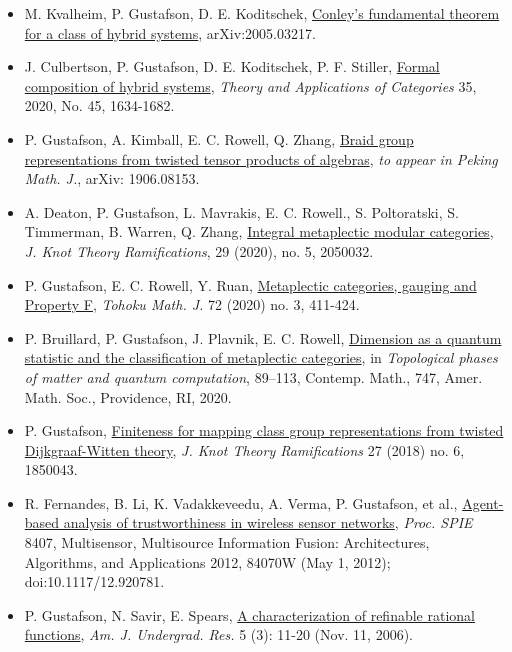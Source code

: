   \begin{itemize}

\item[] M. Kvalheim, P. Gustafson, D. E. Koditschek, \href{https://arxiv.org/abs/2005.03217}{Conley's fundamental theorem for a class of hybrid systems}, arXiv:2005.03217.

\item[] J. Culbertson, P. Gustafson, D. E. Koditschek, P. F. Stiller, \href{http://www.tac.mta.ca/tac/volumes/35/45/35-45abs.html}{Formal composition of hybrid systems}, \emph{Theory and Applications of Categories} {35}, 2020, No. 45, 1634-1682.

  \item[] P. Gustafson, A. Kimball, E. C. Rowell, Q. Zhang, \href{https://arxiv.org/abs/1906.08153}{Braid group representations from twisted tensor products of algebras}, \emph{to appear in Peking Math. J.}, arXiv: 1906.08153.

  \item[]  A. Deaton, P. Gustafson, L. Mavrakis, E. C. Rowell., S. Poltoratski, S. Timmerman, B. Warren, Q. Zhang, \href{https://arxiv.org/abs/1901.04462}{Integral metaplectic modular categories}, \emph{J. Knot Theory Ramifications}, 29 (2020), no. 5, 2050032.
  
  \item[] P. Gustafson, E. C. Rowell, Y. Ruan, \href{https://arxiv.org/abs/1808.00698}{Metaplectic categories, gauging and Property F}, \emph{Tohoku Math. J.} {72} (2020) no. 3, 411-424.

  \item[] P. Bruillard, P. Gustafson, J. Plavnik, E. C. Rowell, \href{https://arxiv.org/abs/1710.10284}{Dimension as a quantum statistic and the classification of metaplectic categories}, in \emph{Topological phases of matter and quantum computation}, 89–113, Contemp. Math., 747, Amer. Math. Soc., Providence, RI, 2020.
    
  \item[] P. Gustafson, \href{https://arxiv.org/abs/1610.06069}{Finiteness for mapping class group representations from twisted Dijkgraaf-Witten theory}, \emph{J. Knot Theory Ramifications} 27 (2018) no. 6, 1850043.

  \item[] R. Fernandes, B. Li, K. Vadakkeveedu, A. Verma, P. Gustafson, et al., \href{http://proceedings.spiedigitallibrary.org/proceeding.aspx?articleid=1354959}{Agent-based analysis of trustworthiness in wireless sensor networks}, \emph{Proc. SPIE} {8407}, Multisensor, Multisource Information Fusion: Architectures, Algorithms, and Applications 2012, 84070W (May 1, 2012); doi:10.1117/12.920781. 

 \item[] P. Gustafson, N. Savir, E. Spears, \href{http://www.uni.edu/ajur/v5n3/Gufstafson\%20et\%20al\%20new\%20pp\%2011-20.pdf}{A characterization of refinable rational functions}, \emph{Am. J. Undergrad. Res.} {5} (3): 11-20 (Nov. 11, 2006).
  
 \end{itemize}
 
